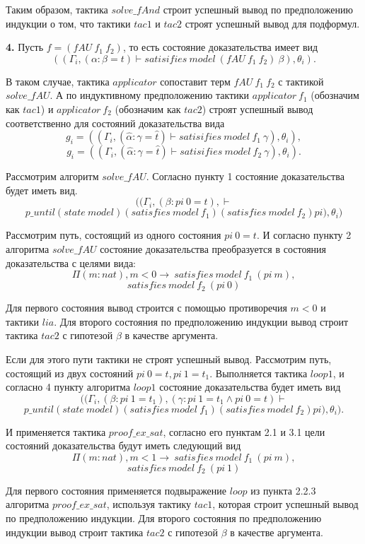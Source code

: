 \documentclass[12pt]{article}
\begin{document}
Таким образом, тактика $solve\_fAnd$ строит успешный вывод по предположению индукции о том, что тактики $tac1$ и $tac2$ строят успешный вывод для подформул.


\textbf{4.} 
Пусть $f=(fAU\ f_1\ f_2)$, то есть состояние доказательства имеет вид 
$$((\Gamma_i, (\alpha: \beta=t) \vdash satisifies\ model\ (fAU\ f_1\ f_2) \ \beta), \theta_i).$$

В таком случае, тактика $applicator$ сопоставит терм $fAU\ f_1\ f_2$ с тактикой $solve\_fAU$.
А по индуктивному предположению тактики $applicator\ f_1$ (обозначим как $tac1$)  и $applicator\ f_2$ (обозначим как $tac2$) 
строят успешный вывод соответственно для состояний доказательства вида
$$g_i = ((\Gamma_i, (\hat{\alpha}: \gamma=\hat{t}) \vdash satisifies\ model\ f_1\ \gamma), \theta_i),$$
$$g_i = ((\Gamma_i, (\hat{\alpha}: \gamma=\hat{t}) \vdash satisifies\ model\ f_2\ \gamma), \theta_i).$$

Рассмотрим алгоритм $solve\_fAU$. Согласно пункту 1 состояние доказательства будет иметь вид.
$$((\Gamma_i, (\beta: pi\ 0 = t), \vdash $$
    $$p\_until (state\ model) (satisfies\ model\ f_1) (satisfies\ model\ f_2) pi), \theta_i)$$

Рассмотрим путь, состоящий из одного состояния $pi\ 0 = t$. И согласно пункту 2 алгоритма $solve\_fAU$ состояние доказательства преобразуется в состояния доказательства с целями вида:
$$\Pi (m : nat), m < 0 \xrightarrow{}\ satisfies\ model\ f_1\ (pi\ m),$$
$$satisfies\ model\ f_2\ (pi\ 0)$$

Для первого состояния вывод строится с помощью противоречия $m<0$ и тактики $lia$. Для второго состояния по предположению индукции вывод строит тактика $tac2$ с гипотезой $\beta$ в качестве аргумента.

Если для этого пути тактики не строят успешный вывод. Рассмотрим путь, состоящий из двух состояний $pi\ 0 = t, pi\ 1 = t_1$.
Выполняется тактика $loop1$, и согласно 4 пункту алгоритма $loop1$ состояние доказательства будет иметь вид
$$((\Gamma_i, (\beta: pi\ 1 = t_1),(\gamma: pi\ 1 = t_1  \wedge pi\ 0 = t) \vdash $$
    $$p\_until (state\ model) (satisfies\ model\ f_1) (satisfies\ model\ f_2) pi), \theta_i).$$

И применяется тактика $proof\_ex\_sat$,
согласно его пунктам 2.1 и 3.1 цели состояний доказательства будут иметь следующий вид
$$\Pi (m : nat), m < 1 \xrightarrow{}\ satisfies\ model\ f_1\ (pi\ m),$$
$$satisfies\ model\ f_2\ (pi\ 1)$$

Для первого состояния применяется подвыражение $loop$ из пункта 2.2.3 алгоритма $proof\_ex\_sat$, используя тактику $tac1$, которая строит успешный вывод по предположению индукции. Для второго состояния по предположению индукции вывод строит тактика $tac2$ с гипотезой $\beta$ в качестве аргумента.
\end{document}

